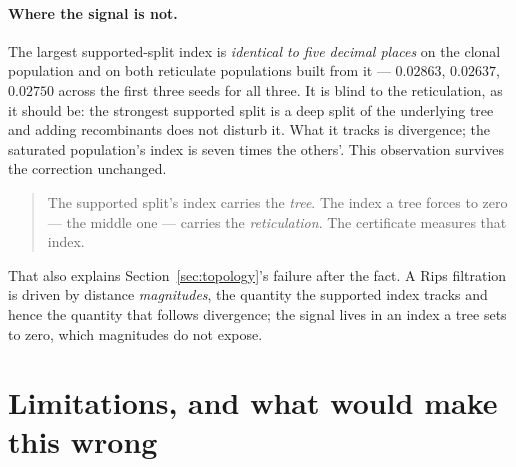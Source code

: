 \documentclass[11pt,a4paper]{article}
\theoremstyle{definition}
\theoremstyle{remark}
\begin{document}
\paragraph{Where the signal is not.} The largest supported-split index is
\emph{identical to five decimal places} on the clonal population and on both
reticulate populations built from it --- $0.02863$, $0.02637$, $0.02750$ across
the first three seeds for all three. It is blind to the reticulation, as it
should be: the strongest supported split is a deep split of the underlying tree
and adding recombinants does not disturb it. What it tracks is divergence; the
saturated population's index is seven times the others'. This observation
survives the correction unchanged.

\begin{quote}
The supported split's index carries the \emph{tree}. The index a tree forces to
zero --- the middle one --- carries the \emph{reticulation}. The certificate
measures that index.
\end{quote}

That also explains Section~\ref{sec:topology}'s failure after the fact. A Rips
filtration is driven by distance \emph{magnitudes}, the quantity the supported
index tracks and hence the quantity that follows divergence; the signal lives in
an index a tree sets to zero, which magnitudes do not expose.

\section{Limitations, and what would make this wrong}\label{sec:limits}
\end{document}
